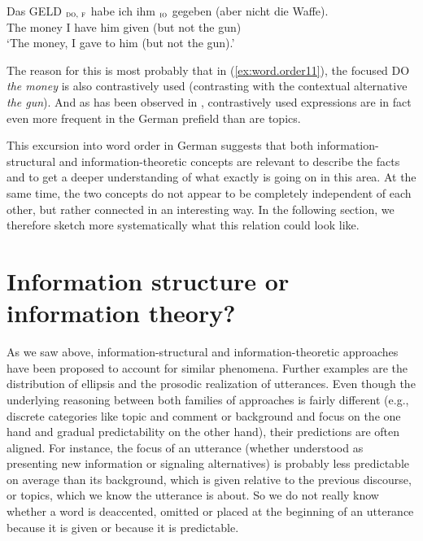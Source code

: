 \documentclass[output=paper,colorlinks,citecolor=brown]{langscibook}
\begin{document}
\ea \label{ex:word.order11}
    \gll {\ob} Das GELD {\cb}$_{\textsc{do, f}}$ habe ich {\ob} ihm {\cb}$_{\textsc{io}}$ gegeben (aber nicht die Waffe).\\
    {} The money {} I have {} him {}  given (but not the gun)\\
    \glt `The money, I gave to him (but not the gun).' %
\z
             
The reason for this is most probably that in (\ref{ex:word.order11}), the focused DO \textit{the money} is also contrastively used (contrasting with the contextual alternative \textit{the gun}). And as has been observed in \citet{speyer2010}, contrastively used expressions are in fact even more frequent in the German prefield than are topics.  

This excursion into word order in German suggests that both information-struc\-tural and information-theoretic concepts are relevant to describe the facts and to get a deeper understanding of what exactly is going on in this area. At the same time, the two concepts do not appear to be completely independent of each other, but rather connected in an interesting way. In the following section, we therefore sketch more systematically what this relation could look like.                 

\section{Information structure or information theory?}
As we saw above, information-structural and information-theoretic approaches have been proposed to account for similar phenomena. Further examples are the distribution of ellipsis and the prosodic realization of utterances. Even though the underlying reasoning between both families of approaches is fairly different (e.g., discrete categories like topic and comment or background and focus on the one hand and gradual predictability on the other hand), their predictions are often aligned. For instance, the focus of an utterance (whether understood as presenting new information or signaling alternatives) is probably less predictable on average than its background, which is given relative to the previous discourse, or topics, which we know the utterance is about. So we do not really know whether a word is deaccented, omitted or placed at the beginning of an utterance because it is given or because it is predictable. 
\end{document}
